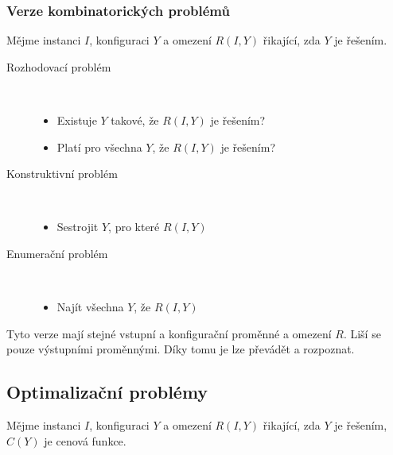 \subsubsection{Verze kombinatorických problémů}

Mějme instanci $I$, konfiguraci $Y$ a omezení $R(I, Y)$ řikající, zda $Y$ je řešením.

\begin{description}
    \item[Rozhodovací problém] \
    \begin{itemize}
        \item Existuje $Y$ takové, že $R(I, Y)$ je řešením?
        \item Platí pro všechna $Y$, že $R(I, Y)$ je řešením?
    \end{itemize}

    \item[Konstruktivní problém] \
    \begin{itemize}
        \item Sestrojit $Y$, pro které $R(I, Y)$
    \end{itemize}

    \item[Enumerační problém] \
    \begin{itemize}
        \item Najít všechna $Y$, že $R(I, Y)$
    \end{itemize}
\end{description}

Tyto verze mají stejné vstupní a konfigurační proměnné a omezení $R$.
Liší se pouze výstupními proměnnými.
Díky tomu je lze převádět a rozpoznat.

\subsection{Optimalizační problémy}

Mějme instanci $I$, konfiguraci $Y$ a omezení $R(I, Y)$ řikající, zda $Y$ je řešením, $C(Y)$ je cenová funkce.

